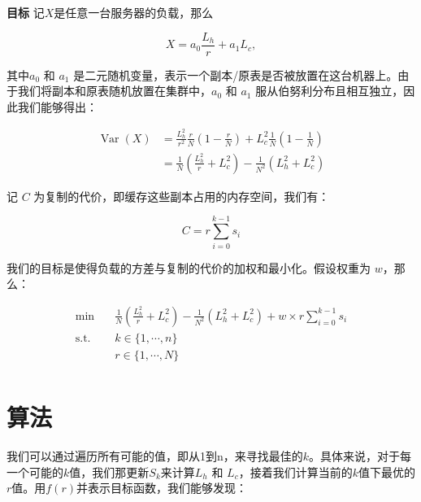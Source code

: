 \par \noindent \textbf{目标} \quad  记$X$是任意一台服务器的负载，那么

\begin{equation}
    X=a_{0} \frac{L_{h}}{r}+a_{1} L_c,
\end{equation}

\par 其中$a_0$ 和 $ a_1$ 是二元随机变量，表示一个副本/原表是否被放置在这台机器上。由于我们将副本和原表随机放置在集群中，$a_0$ 和 $ a_1$ 服从伯努利分布且相互独立，因此我们能够得出：

\begin{equation}
\begin{split}
\operatorname{Var}(X)&=\frac{L_{h}^{2}}{r^{2}}\frac{r}{N}\left(1-\frac{r}{N}\right)+L_{c}^{2}\frac{1}{N}\left(1-\frac{1}{N}\right) \\
& = \frac{1}{N}\left(\frac{L_{h}^{2}}{r}+L_{c}^{2}\right) - \frac{1}{N^2}\left( L_h^2 + L_c^2\right)
\end{split}
\end{equation}

\par 记 $C$ 为复制的代价，即缓存这些副本占用的内存空间，我们有：

\begin{equation}
    C = r \sum_{i=0}^{k-1} s_i
\end{equation}

\par 我们的目标是使得负载的方差与复制的代价的加权和最小化。假设权重为 $w$，那么：

\begin{equation}
\label{eq:obj}
\begin{aligned}
\min \quad & \frac{1}{N}\left(\frac{L_{h}^{2}}{r}+L_{c}^{2}\right) - \frac{1}{N^2}\left( L_h^2 + L_c^2\right) + w\times r \sum_{i=0}^{k-1} s_i\\
\textrm{s.t.} \quad & k \in \{1, \cdots, n\}\\
& r \in \{1, \cdots, N\}    \\
\end{aligned}
\end{equation}

\section{算法}

\par 我们可以通过遍历所有可能的值，即从1到n，来寻找最佳的$k$。具体来说，对于每一个可能的$k$值，我们那更新$S_k$来计算$L_h$ 和 $L_c$，接着我们计算当前的$k$值下最优的$r$值。用$f(r)$并表示目标函数，我们能够发现：

